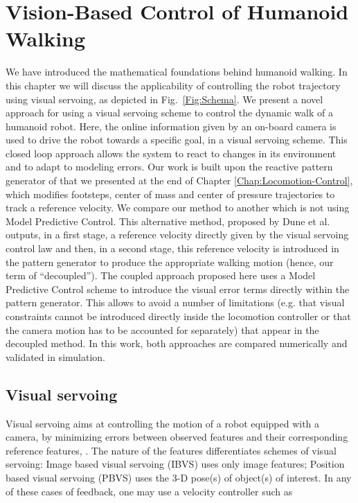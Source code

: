 \chapter{Vision-Based Control of Humanoid Walking} 
\label{Chap:Visual-Servoing}

We have introduced the mathematical foundations behind humanoid walking. In this chapter we will discuss the applicability of controlling the robot trajectory using visual servoing, as depicted in Fig.~\ref{Fig:Schema}. We present a novel approach for using a visual servoing scheme to control the dynamic walk of a humanoid robot. Here, the online information given by an on-board camera is used to drive the robot towards a specific goal, in a visual servoing scheme. This closed loop approach allows the system to react to changes in its environment and to adapt to modeling errors. Our work is built upon the reactive pattern generator of \citep{HerdtAR2010} that we presented at the end of Chapter \ref{Chap:Locomotion-Control}, which modifies footsteps, center of mass and center of pressure trajectories to track a reference velocity. We compare our method to another which is not using Model Predictive Control. This alternative method, proposed by Dune et al. \citep{DuneIROS2010} outputs, in a first stage, a reference velocity directly given by the visual servoing control law and then, in a second stage, this reference velocity is introduced in the pattern generator to produce the appropriate walking motion (hence, our term of ``decoupled''). The coupled approach proposed here uses a Model Predictive Control scheme to introduce the visual error terms directly within the pattern generator. This allows to avoid a number of limitations (e.g. that visual constraints cannot be introduced directly inside the locomotion controller or that the camera motion has to be accounted for separately) that appear in the decoupled method.  In this work, both approaches are compared numerically and validated in simulation.

\section{ Visual servoing}

Visual servoing aims at controlling the motion of a robot equipped with a camera, by minimizing errors between observed features and their corresponding reference features, \citep{ChaumetteRAM2006, ChaumetteRAM2007}. The nature of the features differentiates schemes of visual servoing: Image based visual servoing (IBVS) uses only image features; Position based visual servoing (PBVS) uses the 3-D pose(s) of object(s) of interest. In any of these cases of feedback, one may use a velocity controller such as

